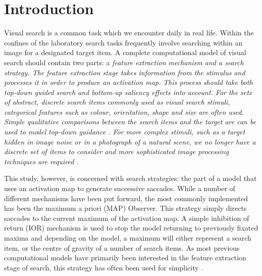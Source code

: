 \section{Introduction}

Visual search is a common task which we encounter daily in real life. Within the confines of the laboratory search tasks frequently involve searching within an image for a designated target item. A complete computational model of visual search should contain two parts: a \itshape feature extraction mechanism \normalfont and a \itshape search strategy\normalfont. The feature extraction stage takes information from the stimulus and processes it in order to produce an activation map. This process should take both top-down guided search \citep{wolfe2007, zelinsky2008} and bottom-up saliency effects \citep{itti-koch2000, gao2008, itti-baldi2009} into account. For the sets of abstract, discrete search items commonly used as visual search stimuli, categorical features such as colour, orientation, shape and size are often used. Simple qualitative comparisons between the search items and the target are can be used to model top-down guidance \citep{pomplun2003, rutishauser-koch2007}. For more complex stimuli, such as a target hidden in image noise or in a photograph of a natural scene, we no longer have a discrete set of items to consider and  more sophisticated image processing techniques are required \citep{rao2002, zelinsky2008, pomplun2007,  hwang2009, tavassoli2009}.

\par

This study, however, is concerned with search strategies: the part of a model that uses an activation map to generate successive saccades. While a number of different mechanisms have been put forward, the most commonly implemented has been the maximum a priori (MAP) Observer. This strategy simply directs saccades to the current maximum of the activation map. A simple inhibition of return (IOR) mechanism is used to stop the model returning to previously fixated maxima and depending on the model, a maximum will either represent a search item, or the centre of gravity of a number of search items. As most previous computational models have primarily been interested in the feature extraction stage of search, this strategy has often been used for simplicity \citep{itti-koch2000, rao2002, pomplun2003, rutishauser-koch2007, clarke2009, zelinsky2008}.
 
\par


